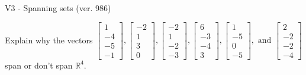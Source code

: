 \begin{exercise}
  \begin{exerciseTitle}V3 - Spanning sets (ver. 986)\end{exerciseTitle}
  \begin{exerciseStatement}
    Explain why the vectors \(\left[\begin{array}{r}
1 \\
-4 \\
-5 \\
-1
\end{array}\right] , \left[\begin{array}{r}
-2 \\
1 \\
3 \\
0
\end{array}\right] , \left[\begin{array}{r}
-2 \\
1 \\
-2 \\
-3
\end{array}\right] , \left[\begin{array}{r}
6 \\
-3 \\
-4 \\
3
\end{array}\right] , \left[\begin{array}{r}
1 \\
-5 \\
0 \\
-5
\end{array}\right] , \text{ and } \left[\begin{array}{r}
2 \\
-2 \\
-2 \\
-4
\end{array}\right]\) span or don't span \(\mathbb{R}^4\). 
	



\end{exerciseStatement}
\end{exercise}
